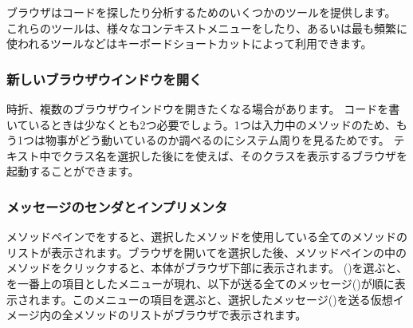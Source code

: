\documentclass[a4paper,10pt,twoside]{book}
\begin{document}
ブラウザはコードを探したり分析するためのいくつかのツールを提供します。
これらのツールは、様々なコンテキストメニューを\actclick したり、あるいは最も頻繁に使われるツールなどはキーボードショートカットによって利用できます。

\subsubsection{新しいブラウザウインドウを開く}

時折、複数のブラウザウインドウを開きたくなる場合があります。
コードを書いているときは少なくとも2つ必要でしょう。1つは入力中のメソッドのため、もう1つは物事がどう動いているのか調べるのにシステム周りを見るためです。
テキスト中でクラス名を選択した後にを使えば、そのクラスを表示するブラウザを起動することができます。


\subsubsection{メッセージのセンダとインプリメンタ}

メソッドペインでを\actclick すると、選択したメソッドを使用している全てのメソッドのリストが表示されます。ブラウザを開いてを選択した後、メソッドペインの中のメソッドをクリックすると、本体がブラウザ下部に表示されます。  ()を選ぶと、を一番上の項目としたメニューが現れ、以下が送る全てのメッセージ()が順に表示されます。このメニューの項目を選ぶと、選択したメッセージ()を送る仮想イメージ内の全メソッドのリストがブラウザで表示されます。

\end{document}
